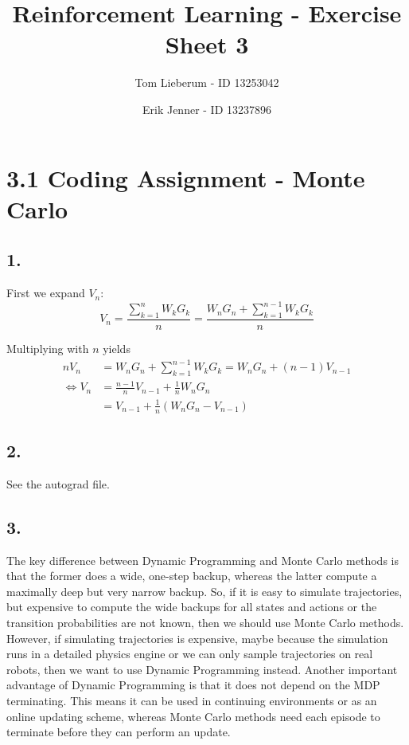 \documentclass{article}
\title{Reinforcement Learning - Exercise Sheet 3}
\author{Tom Lieberum - ID 13253042 \and Erik Jenner - ID 13237896}
\begin{document}
\maketitle

\section*{3.1 Coding Assignment - Monte Carlo}

\subsection*{1.}

First we expand $V_n$:
\[
V_n = \frac{\sum_{k=1}^n W_kG_k}{n} = \frac{W_nG_n + \sum_{k=1}^{n-1} W_kG_k}{n}
\]

\noindent Multiplying with $n$ yields
\begin{align*}
nV_n &= W_nG_n + \sum_{k=1}^{n-1} W_kG_k = W_nG_n + (n-1) V_{n-1}\\[2mm] \iff V_n &= \frac{n-1}{n} V_{n-1} + \frac{1}{n}W_nG_n\\[2mm] &= V_{n-1} + \frac{1}{n}(W_nG_n - V_{n-1}) 
\end{align*}


\subsection*{2.}
See the autograd file.

\subsection*{3.}
The key difference between Dynamic Programming and Monte Carlo methods is that the former does a wide, one-step backup, whereas the latter compute a maximally deep but very narrow backup. So, if it is easy to simulate trajectories, but expensive to compute the wide backups for all states and actions or the transition probabilities are not known, then we should use Monte Carlo methods. However, if simulating trajectories is expensive, maybe because the simulation runs in a detailed physics engine or we can only sample trajectories on real robots, then we want to use Dynamic Programming instead. Another important advantage of Dynamic Programming is that it does not depend on the MDP terminating. This means it can be used in continuing environments or as an online updating scheme, whereas Monte Carlo methods need each episode to terminate before they can perform an update.
\end{document}
